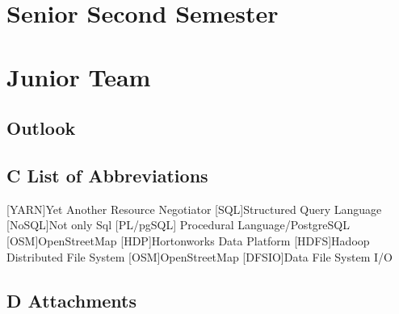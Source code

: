 \documentclass[12pt]{report}
\renewcommand{\listfigurename}{\begingroup
\tocchapter
\tocfile{\listoffigurename}{B Illustration Directory}
\endgroup}
\begin{document}
\chapter{Senior Second Semester}






\chapter{Junior Team}


\section{Outlook}

\newpage


\renewcommand{\listfigurename}{B Illustration Directory}
\listoffigures
\section*{C List of Abbreviations}
\begin{acronym}
[YARN]{Yet Another Resource Negotiator}
 [SQL]{Structured Query Language}
 [NoSQL]{Not only Sql}
[PL/pgSQL] {Procedural Language/PostgreSQL}
[OSM]{OpenStreetMap}
[HDP]{Hortonworks Data Platform}
 [HDFS]{Hadoop Distributed File System}
[OSM]{OpenStreetMap}
[DFSIO]{Data File System I/O}
\end{acronym}
\newpage
\section*{D Attachments}
\end{document}
